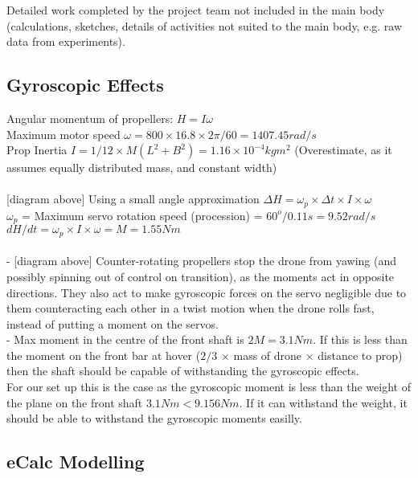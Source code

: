 \label{sec:AppA}
\color{red}
Detailed work completed by the project team not included in the main body (calculations, sketches, details of activities not suited to the main body, e.g. raw data from experiments).
\color{black}

\subsection{Gyroscopic Effects}
Angular momentum of propellers: $H = I\omega$\\
Maximum motor speed $\omega = 800\times16.8\times2\pi/60 = 1407.45rad/s$\\
Prop Inertia $I = 1/12\times M(L^2+B^2) = 1.16\times10^{-4}kgm^2$ (Overestimate, as it assumes equally distributed mass, and constant width)\\\\

[diagram above] Using a small angle approximation $\Delta H = \omega_p \times\Delta t \times I \times \omega$\\ 
$\omega_p$ = Maximum servo rotation speed (procession) = $60^o/0.11s = 9.52rad/s$\\
$dH/dt = \omega_p \times I \times \omega = M = 1.55Nm$\\\\

- [diagram above] Counter-rotating propellers stop the drone from yawing (and possibly spinning out of control on transition), as the moments act in opposite directions. They also act to make gyroscopic forces on the servo negligible due to them counteracting each other in a twist motion when the drone rolls fast, instead of putting a moment on the servos.\\
- Max moment in the centre of the front shaft is $2M = 3.1Nm$. If this is less than the moment on the front bar at hover ($2/3$ $\times $ mass of drone $\times$ distance to prop) then the shaft should be capable of withstanding the gyroscopic effects.\\
For our set up this is the case as the gyroscopic moment is less than the weight of the plane on the front shaft $3.1Nm < 9.156Nm$. If it can withstand the weight, it should be able to withstand the gyroscopic moments easilly.

\subsection{eCalc Modelling}
\label{sec:ecalc}